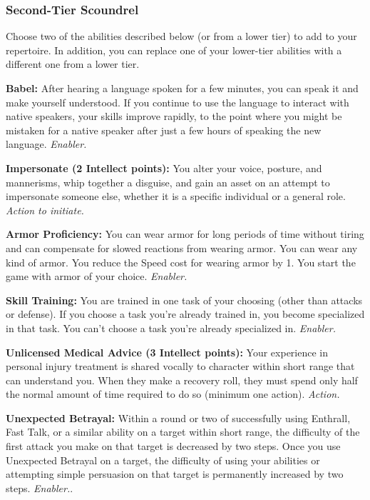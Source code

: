 \documentclass[a4paper,10pt,final,twocolumn,oneside]{book}
\newcommand{\itemAbility}[2]{\textcolor{25gray}{\textbullet\textbf{ #1:}}{ #2}\par}
\newcommand{\enabler}{\textit{ Enabler.}}
\newcommand{\action}{\textit{ Action.}}
\newcommand{\actionInit}{\textit{ Action to initiate.}}
\begin{document}

\subsubsection*{Second-Tier Scoundrel}
\label{subsub:scoundrelSecondTier}

Choose two of the abilities described below (or from a lower tier) to add to your repertoire. In addition, you can replace one of your lower-tier abilities with a different one from a lower tier.

\itemAbility{Babel}{After hearing a language spoken for a few minutes, you can speak it and make yourself understood. If you continue to use the language to interact with native speakers, your skills improve rapidly, to the point where you might be mistaken for a native speaker after just a few hours of speaking the new language.\enabler}

\itemAbility{Impersonate (2 Intellect points)}{You alter your voice, posture, and mannerisms, whip together a disguise, and gain an asset on an attempt to impersonate someone else, whether it is a specific individual or a general role.\actionInit}

\itemAbility{Armor Proficiency}{You can wear armor for long periods of time without tiring and can compensate for slowed reactions from wearing armor. You can wear any kind of armor. You reduce the Speed cost for wearing armor by 1. You start the game with armor of your choice.\enabler}

\itemAbility{Skill Training}{You are trained in one task of your choosing (other than attacks or defense). If you choose a task you’re already trained in, you become specialized in that task. You can’t choose a task you’re already specialized in.\enabler}

\itemAbility{Unlicensed Medical Advice (3 Intellect points)}{Your experience in personal injury treatment is shared vocally to character within short range that can understand you. When they make a recovery roll, they must spend only half the normal amount of time required to do so (minimum one action).\action}

\itemAbility{Unexpected Betrayal}{Within a round or two of successfully using Enthrall, Fast Talk, or a similar ability on a target within short range, the difficulty of the first attack you make on that target is decreased by two steps. Once you use Unexpected Betrayal on a target, the difficulty of using your abilities or attempting simple persuasion on that target is permanently increased by two steps.\enabler.}
\end{document}
